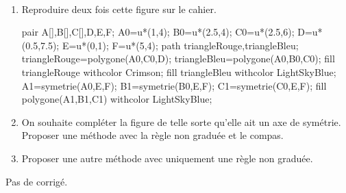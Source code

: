\begin{exercice*}
   \ \\ [-5mm]
   \begin{enumerate}
      \item Reproduire deux fois cette figure sur le cahier.
         \begin{center}
            \begin{Geometrie}
               pair A[],B[],C[],D,E,F;
               A0=u*(1,4);
               B0=u*(2.5,4);
               C0=u*(2.5,6);
               D=u*(0.5,7.5);
               E=u*(0,1);
               F=u*(5,4);
               path triangleRouge,triangleBleu;
               triangleRouge=polygone(A0,C0,D);
               triangleBleu=polygone(A0,B0,C0);               
               fill triangleRouge withcolor Crimson;
               fill triangleBleu withcolor LightSkyBlue;
               A1=symetrie(A0,E,F);
               B1=symetrie(B0,E,F);
               C1=symetrie(C0,E,F);
               fill polygone(A1,B1,C1) withcolor LightSkyBlue;
            \end{Geometrie}
         \end{center}
      \item On souhaite compléter la figure de telle sorte qu'elle ait un axe de symétrie. Proposer une méthode avec la règle non graduée et le compas.
      \item Proposer une autre méthode avec uniquement une règle non graduée.
   \end{enumerate}
\end{exercice*}
\begin{corrige}
   Pas de corrigé.
\end{corrige}